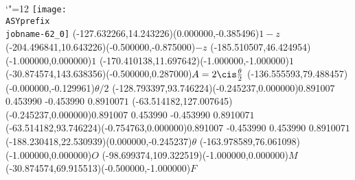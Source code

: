 \setlength{\unitlength}{1pt}%
\makeatletter%
\let\ASYencoding\f@encoding%
\let\ASYfamily\f@family%
\let\ASYseries\f@series%
\let\ASYshape\f@shape%
\makeatother%
{\catcode`"=12%
\texttt{[image: \\ASYprefix\\jobname-62\_0]}%
}%
\color{ASYcolor}%
\fontsize{12.000000}{14.400000}\selectfont%
\usefont{\ASYencoding}{\ASYfamily}{\ASYseries}{\ASYshape}%
\ASYalign(-127.632266,14.243226)(0.000000,-0.385496){$1-z$}%
\color{ASYcolor}%
\fontsize{12.000000}{14.400000}\selectfont%
\ASYalign(-204.496841,10.643226)(-0.500000,-0.875000){$-z$}%
\color{ASYcolor}%
\fontsize{12.000000}{14.400000}\selectfont%
\ASYalign(-185.510507,46.424954)(-1.000000,0.000000){$1$}%
\color{ASYcolor}%
\fontsize{12.000000}{14.400000}\selectfont%
\ASYalign(-170.410138,11.697642)(-1.000000,-1.000000){$1$}%
\color{ASYcolor}%
\fontsize{12.000000}{14.400000}\selectfont%
\ASYalign(-30.874574,143.638356)(-0.500000,0.287000){$A=2\cis\frac{\theta}{2}$}%
\color{ASYcolor}%
\fontsize{12.000000}{14.400000}\selectfont%
\ASYalign(-136.555593,79.488457)(-0.000000,-0.129961){$\theta / 2$}%
\color{ASYcolor}%
\fontsize{12.000000}{14.400000}\selectfont%
\ASYalignT(-128.793397,93.746224)(-0.245237,0.000000){0.891007 0.453990 -0.453990 0.891007}{$1$}%
\color{ASYcolor}%
\fontsize{12.000000}{14.400000}\selectfont%
\ASYalignT(-63.514182,127.007645)(-0.245237,0.000000){0.891007 0.453990 -0.453990 0.891007}{$1$}%
\color{ASYcolor}%
\fontsize{12.000000}{14.400000}\selectfont%
\ASYalignT(-63.514182,93.746224)(-0.754763,0.000000){0.891007 -0.453990 0.453990 0.891007}{$1$}%
\color{ASYcolor}%
\fontsize{12.000000}{14.400000}\selectfont%
\ASYalign(-188.230418,22.530939)(0.000000,-0.245237){$\theta$}%
\color{ASYcolor}%
\fontsize{12.000000}{14.400000}\selectfont%
\ASYalign(-163.978589,76.061098)(-1.000000,0.000000){$O$}%
\color{ASYcolor}%
\fontsize{12.000000}{14.400000}\selectfont%
\ASYalign(-98.699374,109.322519)(-1.000000,0.000000){$M$}%
\color{ASYcolor}%
\fontsize{12.000000}{14.400000}\selectfont%
\ASYalign(-30.874574,69.915513)(-0.500000,-1.000000){$F$}%
